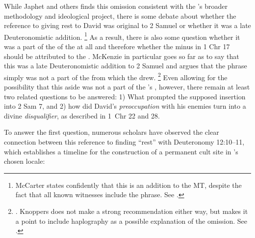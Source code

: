 While Japhet and others finds this omission consistent with the \chronicler's broader methodology and ideological project,%
    \autocite[328]{japhet1993}
there is some debate about whether the reference to \yahweh giving rest to David was original to 2 Samuel or whether it was a late Deuteronomistic addition.%
    \footnote{McCarter states confidently that this is an addition to the MT, despite the fact that all known witnesses include the phrase. See \cite[191]{mccarter1984}.}
As a result, there is also some question whether it was a part of the \vorlage of the \chronicler at all and therefore whether the minus in 1 Chr 17 should be attributed to the \chronicler. McKenzie in particular goes so far as to say that this was a late Deuteronomistic addition to 2 Samuel and argues that the phrase simply was not a part of the \vorlage from which the \chronicler drew.%
    \footnote{\cite[63]{mckenzie1985}. Knoppers does not make a strong recommendation either way, but makes it a point to include haplography as a possible explanation of the omission. See \cite[666]{knoppers2007}.}
Even allowing for the possibility that this aside was not a part of the \chronicler's \vorlage, however, there remain at least two related questions to be answered: 1) What prompted the supposed insertion into 2 Sam 7, and 2) how did David's \emph{preoccupation} with his enemies turn into a divine \emph{disqualifier}, as described in 1~Chr 22 and 28.

To answer the first question, numerous scholars have observed the clear connection between this reference to finding ``rest'' with Deuteronomy 12:10--11, which establishes a timeline for the construction of a permanent cult site in \yahweh's chosen locale:


